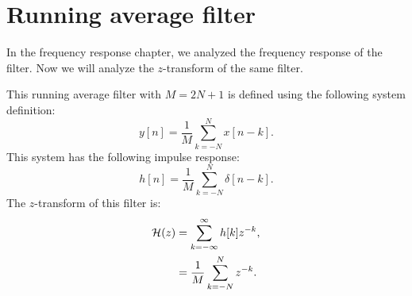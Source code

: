 \section{Running average filter}
\label{r_avg_z}

In the frequency response chapter, we analyzed the frequency response
of the  filter. Now we will
analyze the $z$-transform of the same filter. 

This running average filter with $M=2N+1$ is defined using the
following system definition:
\begin{equation}
y[n] = \frac{1}{M}\sum_{k=-N}^{N} x[n-k].
\end{equation}
This system has the following impulse response:
\begin{equation}
h[n] = \frac{1}{M}\sum_{k=-N}^{N} \delta[n-k].
\end{equation}
The $z$-transform of this filter is:
\begin{align}
\mathcal{H}(z) &= \sum_{k=-\infty}^{\infty} h[k]z^{-k}, \\
     &= \frac{1}{M}\sum_{k=-N}^{N} z^{-k}.
\end{align}
